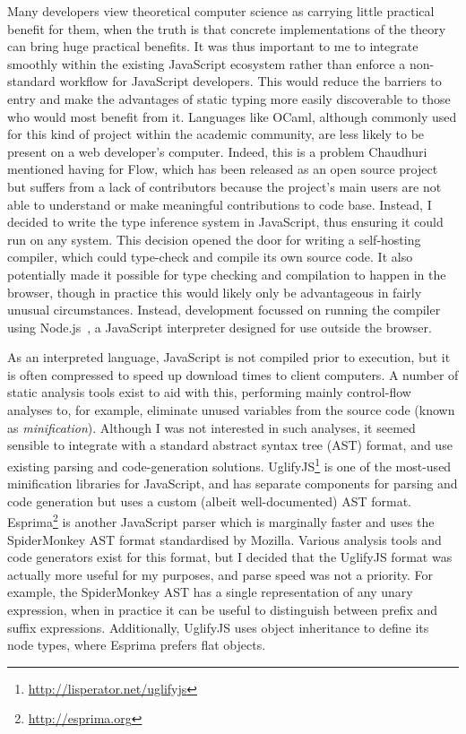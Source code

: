 \documentclass[12pt,a4paper,twoside,openright]{report}
\theoremstyle{definition}
\theoremstyle{dotless}
\begin{document}
Many developers view theoretical computer science as carrying little practical
benefit for them, when the truth is that concrete implementations of the theory
can bring huge practical benefits. It was thus important to me to integrate
smoothly within the existing JavaScript ecosystem rather than enforce a
non-standard workflow for JavaScript developers. This would reduce the barriers
to entry and make the advantages of static typing more easily discoverable to
those who would most benefit from it. Languages like OCaml, although commonly
used for this kind of project within the academic community, are less likely to be
present on a web developer's computer. Indeed, this is a problem Chaudhuri
mentioned having for Flow, which has been released as an open source project
but suffers from a lack of contributors because the project's main users are
not able to understand or make meaningful contributions to code base.
Instead, I decided to write the type inference system in JavaScript, thus
ensuring it could run on any system. This decision opened the door for writing
a self-hosting compiler, which could type-check and compile its own source
code. It also potentially made it possible for type checking and compilation to
happen in the browser, though in practice this would likely only be advantageous in
fairly unusual circumstances. Instead, development focussed on running the
compiler using Node.js~\cite{nodejs}, a JavaScript interpreter designed for use
outside the browser.

As an interpreted language, JavaScript is not compiled prior to execution, but
it is often compressed to speed up download times to client computers. A number
of static analysis tools exist to aid with this, performing mainly control-flow
analyses to, for example, eliminate unused variables from the source code
(known as \textit{minification}). Although I was not interested in such
analyses, it seemed sensible to integrate with a standard abstract syntax tree
(AST) format, and use existing parsing and code-generation solutions.
UglifyJS\footnote{\href{http://lisperator.net/uglifyjs}{http://lisperator.net/uglifyjs}} is one of the
most-used minification libraries for JavaScript, and has separate components
for parsing and code generation but uses a custom (albeit well-documented) AST
format. Esprima\footnote{\href{http://esprima.org}{http://esprima.org}} is another JavaScript parser
which is marginally faster and uses the SpiderMonkey AST format standardised by
Mozilla. Various analysis tools and code generators exist for this format, but
I decided that the UglifyJS format was actually more useful for my purposes,
and parse speed was not a priority. For example, the SpiderMonkey AST has a
single representation of any unary expression, when in practice it can be
useful to distinguish between prefix and suffix expressions.  Additionally,
UglifyJS uses object inheritance to define its node types, where Esprima
prefers flat objects. 
\end{document}
